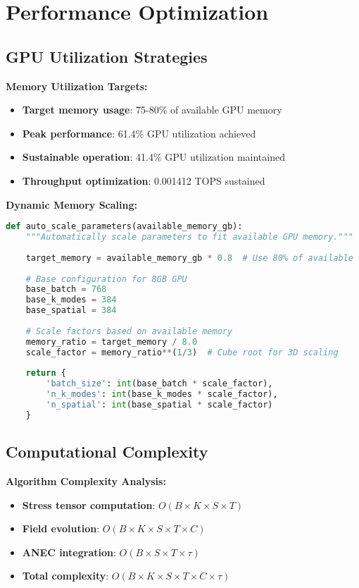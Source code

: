 \documentclass[11pt]{article}
\begin{document}
\section{Performance Optimization}

\subsection{GPU Utilization Strategies}

\textbf{Memory Utilization Targets:}
\begin{itemize}
    \item \textbf{Target memory usage}: 75-80\% of available GPU memory
    \item \textbf{Peak performance}: 61.4\% GPU utilization achieved
    \item \textbf{Sustainable operation}: 41.4\% GPU utilization maintained
    \item \textbf{Throughput optimization}: 0.001412 TOPS sustained
\end{itemize}

\textbf{Dynamic Memory Scaling:}
\begin{lstlisting}[language=Python]
def auto_scale_parameters(available_memory_gb):
    """Automatically scale parameters to fit available GPU memory."""
    
    target_memory = available_memory_gb * 0.8  # Use 80% of available
    
    # Base configuration for 8GB GPU
    base_batch = 768
    base_k_modes = 384
    base_spatial = 384
    
    # Scale factors based on available memory
    memory_ratio = target_memory / 8.0
    scale_factor = memory_ratio**(1/3)  # Cube root for 3D scaling
    
    return {
        'batch_size': int(base_batch * scale_factor),
        'n_k_modes': int(base_k_modes * scale_factor),
        'n_spatial': int(base_spatial * scale_factor)
    }
\end{lstlisting}

\subsection{Computational Complexity}

\textbf{Algorithm Complexity Analysis:}
\begin{itemize}
    \item \textbf{Stress tensor computation}: $O(B \times K \times S \times T)$
    \item \textbf{Field evolution}: $O(B \times K \times S \times T \times C)$
    \item \textbf{ANEC integration}: $O(B \times S \times T \times \tau)$
    \item \textbf{Total complexity}: $O(B \times K \times S \times T \times C \times \tau)$
\end{itemize}
\end{document}
